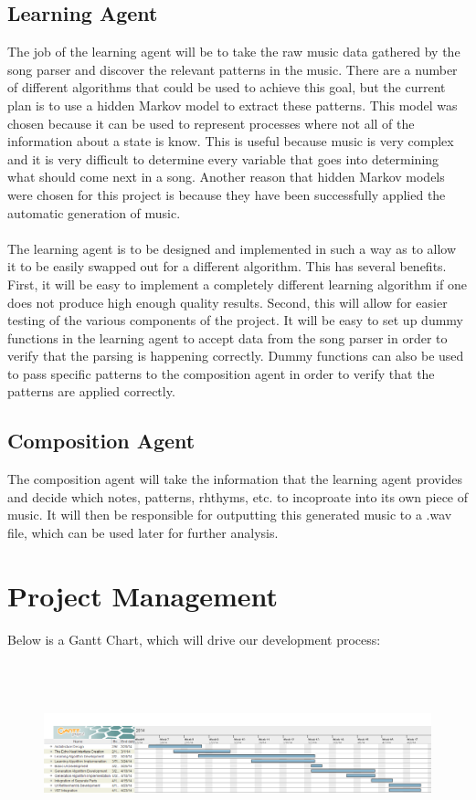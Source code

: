 \documentclass{article}
\begin{document}
\subsection{Learning Agent}
The job of the learning agent will be to take the raw music data gathered by the song parser and discover the relevant patterns in the music. There are a number of different algorithms that could be used to achieve this goal, but the current plan is to use a hidden Markov model to extract these patterns. This model was chosen because it can be used to represent processes where not all of the information about a state is know. This is useful because music is very complex and it is very difficult to determine every variable that goes into determining what should come next in a song. Another reason that hidden Markov models were chosen for this project is because they have been successfully applied the automatic generation of music.\\
\\
The learning agent is to be designed and implemented in such a way as to allow it to be easily swapped out for a different algorithm. This has several benefits. First, it will be easy to implement a completely different learning algorithm if one does not produce high enough quality results. Second, this will allow for easier testing of the various components of the project. It will be easy to set up dummy functions in the learning agent to accept data from the song parser in order to verify that the parsing is happening correctly. Dummy functions can also be used to pass specific patterns to the composition agent in order to verify that the patterns are applied correctly.

\subsection{Composition Agent}
The composition agent will take the information that the learning agent provides and decide which notes, patterns, rhthyms, etc. to incoproate into its own piece of music.  It will then be responsible for outputting this generated music to a .wav file, which can be used later for further analysis.

\section{Project Management}
Below is a Gantt Chart, which will drive our development process:
\begin{figure}[ht]
\centerline {
\includegraphics[width=600, height=200]{gantt.png}
}
\end{figure}
\end{document}
